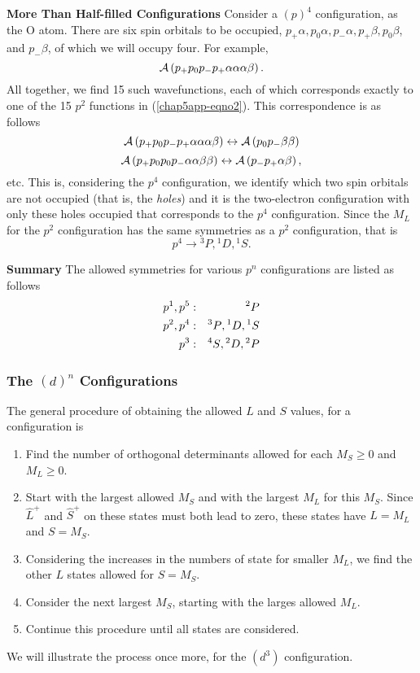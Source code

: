 {\bf More Than Half-filled Configurations}
Consider a $(p)^4$ configuration, as the O atom.  There are six spin 
orbitals to be occupied, $p_+ \alpha , p_0 \alpha , p_- \alpha , p_+ 
\beta , p_0 \beta$, and $p_- \beta$, of which we will occupy four.  
For example,
\begin{equation}
{\cal A} \left( p_+ p_0 p_- p_+ \alpha \alpha \alpha \beta \right).
\end{equation}
All together, we find 15 such wavefunctions, each of which 
corresponds exactly to one of the 15 $p^2$ functions in
(\ref{chap5app-eqno2}).   
This correspondence is as follows
\begin{equation}
{\cal A} \left( p_+ p_0 p_- p_+ \alpha \alpha \alpha \beta \right) 
\leftrightarrow {\cal A} \left( p_0 p_- \beta \beta \right)
\end{equation}
\begin{equation}
{\cal A} \left( p_+ p_0 p_0 p_- \alpha \alpha \beta \beta \right) 
\leftrightarrow {\cal A} \left( p_- p_+ \alpha \beta \right),
\end{equation}
etc.  This is, considering the $p^4$ configuration, we identify which
two spin orbitals are not occupied (that is, the \emph{holes}) and it
is the two-electron configuration with only these holes occupied that
corresponds to the $p^4$ configuration.  Since the $M_L$ for the $p^2$
configuration has the same symmetries as a $p^2$ configuration, that
is
\begin{equation}
p^4 \rightarrow {^3P} , {^1D}, {^1S} .
\end{equation}

{\bf Summary}
The allowed symmetries for various $p^n$ configurations are listed as 
follows
\begin{eqnarray}
p^1 , p^5 &:& {^2P}\cr
p^2 , p^4 &:& {^3P}, {^1D}, {^1S}\cr
p^3 &:& {^4S} , {^2D} , {^2P}
\end{eqnarray}

\subsubsection{The $(d)^n$ Configurations}

The general procedure of obtaining the allowed $L$ and $S$ values, 
for a configuration is 
\begin{enumerate}
\item Find the number of orthogonal 
determinants allowed for each $M_S \geq 0$ and $M_L \geq 0$.  
\item Start with the largest allowed $M_S$ and with the largest $M_L$ for 
this $M_S$.  Since ${\hat L}^+$ and ${\hat S}^+$ on these states must 
both lead to zero, these states have $L = M_L$ and $S = M_S$.  
\item Considering the increases in the numbers of state for smaller $M_L$, 
we find the other $L$ states allowed for $S = M_S$.  
\item Consider the next largest $M_S$, starting with the larges allowed $M_L$. 
\item Continue this procedure until all states are 
considered.  
\end{enumerate}
We will illustrate the process once more, for the $(d^3)$ 
configuration.

